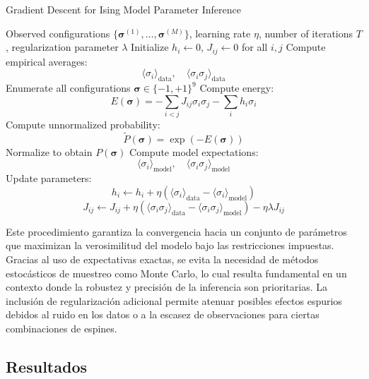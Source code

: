 \documentclass[a4paper,10pt,twocolumn]{article}
\begin{document}
\begin{algorithm}[H]
    \caption{Gradient Descent for Ising Model Parameter Inference}
    \begin{algorithmic}[1]
    \Require Observed configurations \( \{\boldsymbol{\sigma}^{(1)}, \dots, \boldsymbol{\sigma}^{(M)}\} \), learning rate \( \eta \), number of iterations \( T \), regularization parameter \( \lambda \)
    \State Initialize \( h_i \gets 0 \), \( J_{ij} \gets 0 \) for all \( i, j \)
        \State Compute empirical averages:
            \[ \langle \sigma_i \rangle_{\text{data}}, \quad \langle \sigma_i \sigma_j \rangle_{\text{data}} \]
        \State Enumerate all configurations \( \boldsymbol{\sigma} \in \{-1, +1\}^9 \)
            \State Compute energy: 
                \[ E(\boldsymbol{\sigma}) = -\sum_{i<j} J_{ij} \sigma_i \sigma_j - \sum_i h_i \sigma_i \]
            \State Compute unnormalized probability: 
                \[ \tilde{P}(\boldsymbol{\sigma}) = \exp(-E(\boldsymbol{\sigma})) \]
        \EndFor
        \State Normalize to obtain \( P(\boldsymbol{\sigma}) \)
        \State Compute model expectations:
            \[ \langle \sigma_i \rangle_{\text{model}}, \quad \langle \sigma_i \sigma_j \rangle_{\text{model}} \]
        \State Update parameters:
            \[
            h_i \gets h_i + \eta \left( \langle \sigma_i \rangle_{\text{data}} - \langle \sigma_i \rangle_{\text{model}} \right)
            \]
            \[
            J_{ij} \gets J_{ij} + \eta \left( \langle \sigma_i \sigma_j \rangle_{\text{data}} - \langle \sigma_i \sigma_j \rangle_{\text{model}} \right) - \eta \lambda J_{ij}
            \]
    \EndFor
    \end{algorithmic}
\end{algorithm}

Este procedimiento garantiza la convergencia hacia un conjunto 
de parámetros que maximizan la verosimilitud del modelo bajo 
las restricciones impuestas. Gracias al uso de expectativas 
exactas, se evita la necesidad de métodos estocásticos de 
muestreo como Monte Carlo, lo cual resulta fundamental en un 
contexto donde la robustez y precisión de la inferencia son 
prioritarias. La inclusión de regularización adicional permite 
atenuar posibles efectos espurios debidos al ruido en los datos 
o a la escasez de observaciones para ciertas combinaciones de 
espines.

\subsection{Resultados}
\end{document}
